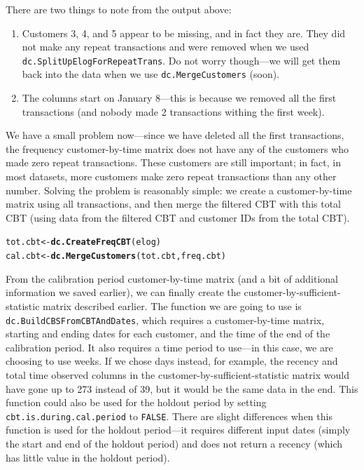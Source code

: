 \documentclass[10pt, letterpaper, onecolumn, oneside, final]{article}\usepackage[]{graphicx}\usepackage[]{color}
\makeatletter
\newcommand{\hlstd}[1]{\textcolor[rgb]{0.345,0.345,0.345}{#1}}%
\newcommand{\hlkwb}[1]{\textcolor[rgb]{0.69,0.353,0.396}{#1}}%
\newcommand{\hlkwd}[1]{\textcolor[rgb]{0.737,0.353,0.396}{\textbf{#1}}}%
\newenvironment{kframe}{%
 \def\at@end@of@kframe{}%
 \ifinner\ifhmode%
  \def\at@end@of@kframe{\end{minipage}}%
  \begin{minipage}{\columnwidth}%
 \fi\fi%
 \def\FrameCommand##1{\hskip\@totalleftmargin \hskip-\fboxsep
 \colorbox{shadecolor}{##1}\hskip-\fboxsep
     \hskip-\linewidth \hskip-\@totalleftmargin \hskip\columnwidth}%
 \MakeFramed {\advance\hsize-\width
   \@totalleftmargin\z@ \linewidth\hsize
   \@setminipage}}%
 {\par\unskip\endMakeFramed%
 \at@end@of@kframe}
\newenvironment{knitrout}{}{} %
\makeatother
\begin{document}
There are two things to note from the output above:
\begin{enumerate}
  \item Customers 3, 4, and 5 appear to be missing, and in fact they
    are. They did not make any repeat transactions and were removed
    when we used \texttt{dc.SplitUpElogForRepeatTrans}. Do not worry
    though---we will get them back into the data when we use
    \texttt{dc.MergeCustomers} (soon).
  \item The columns start on January 8---this is because we removed
    all the first transactions (and nobody made 2 transactions withing
    the first week).
\end{enumerate}

We have a small problem now---since we have deleted all the first
transactions, the frequency customer-by-time matrix does not have any
of the customers who made zero repeat transactions. These customers
are still important; in fact, in most datasets, more customers make
zero repeat transactions than any other number. Solving the problem is
reasonably simple: we create a customer-by-time matrix using all
transactions, and then merge the filtered CBT with this total CBT
(using data from the filtered CBT and customer IDs from the total
CBT).

\begin{knitrout}
\color{fgcolor}\begin{kframe}
\begin{alltt}
\hlstd{tot.cbt} \hlkwb{<-} \hlkwd{dc.CreateFreqCBT}\hlstd{(elog)}
\hlstd{cal.cbt} \hlkwb{<-} \hlkwd{dc.MergeCustomers}\hlstd{(tot.cbt, freq.cbt)}
\end{alltt}
\end{kframe}
\end{knitrout}

From the calibration period customer-by-time matrix (and a bit of
additional information we saved earlier), we can finally create the
customer-by-sufficient-statistic matrix described earlier. The
function we are going to use is \texttt{dc.BuildCBSFromCBTAndDates},
which requires a customer-by-time matrix, starting and ending dates
for each customer, and the time of the end of the calibration period.
It also requires a time period to use---in this case, we are choosing
to use weeks. If we chose days instead, for example, the recency and
total time observed columns in the customer-by-sufficient-statistic
matrix would have gone up to 273 instead of 39, but it would be the
same data in the end. This function could also be used for the holdout
period by setting \texttt{cbt.is.during.cal.period} to
\texttt{FALSE}. There are slight differences when this function is
used for the holdout period---it requires different input dates
(simply the start and end of the holdout period) and does not return a
recency (which has little value in the holdout period).
\end{document}
